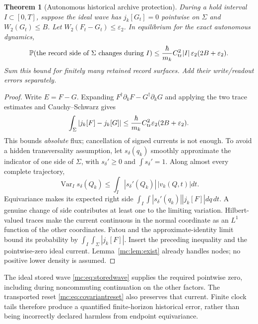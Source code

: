 \documentclass[11pt,oneside,openany]{book}
\newtheorem{theorem}{Theorem}[chapter]
\theoremstyle{definition}
\theoremstyle{remark}\newtheorem{remark}[theorem]{Remark}
\providecommand{\Prb}{\mathbb P}
\begin{document}
\begin{theorem}[Autonomous historical archive protection]\label{mc:history}
During a hold interval $I\subset[0,T]$, suppose the ideal wave has $j_k[G_t]=0$ pointwise on $\Sigma$ and $W_2(G_t)\le B$. Let $W_2(F_t-G_t)\le\varepsilon_2$. In equilibrium for the exact autonomous dynamics,
\begin{equation}\label{mc:eq:archiveerror}
 \Prb(\text{the record side of }\Sigma\text{ changes during }I)
 \le\frac{\hbar}{m_k}C_{\rm tr}^2|I|\,
                     \varepsilon_2(2B+\varepsilon_2).
\end{equation}
Sum this bound for finitely many retained record surfaces. Add their write/readout errors separately.
\end{theorem}
\begin{proof}
Write $E=F-G$. Expanding $F^\dagger\partial_kF-G^\dagger\partial_kG$ and applying the two trace estimates and Cauchy--Schwarz gives
\[
 \int_\Sigma|j_k[F]-j_k[G]|\le
 \frac\hbar{m_k}C_{\rm tr}^2\varepsilon_2(2B+\varepsilon_2).
\]
This bounds \emph{absolute} flux; cancellation of signed currents is not enough.
To avoid a hidden transversality assumption, let $s_\delta(q_k)$ smoothly approximate the indicator of one side of $\Sigma$, with $s_\delta'\ge0$ and $\int s_\delta'=1$. Along almost every complete trajectory,
\[
 \operatorname{Var}_{I}s_\delta(Q_k)\le
 \int_I |s_\delta'(Q_k)|\,|v_k(Q,t)|dt.
\]
Equivariance makes its expected right side $\int_I\int |s_\delta'(q_k)||j_k[F]|dq\,dt$. A genuine change of side contributes at least one to the limiting variation. Hilbert-valued traces make the current continuous in the normal coordinate as an $L^1$ function of the other coordinates. Fatou and the approximate-identity limit bound its probability by $\int_I\int_\Sigma|j_k[F]|$. Insert the preceding inequality and the pointwise-zero ideal current. Lemma~\ref{mc:lem:exist} already handles nodes; no positive lower density is assumed.
\end{proof}
The ideal stored wave \eqref{mc:eq:storedwave} supplies the required pointwise zero, including during noncommuting continuation on the other factors. The transported reset \eqref{mc:eq:covariantreset} also preserves that current. Finite clock tails therefore produce a quantified finite-horizon historical error, rather than being incorrectly declared harmless from endpoint equivariance.
\end{document}
